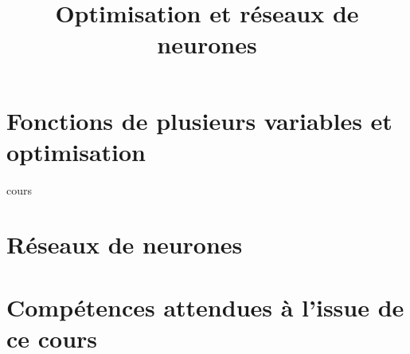 \documentclass[fleqn,a4paper,11pt]{book}
\title{Optimisation et réseaux de neurones}
\begin{document}
\maketitle
\tableofcontents
\newpage

\newcommand{\myscale}{1}
\newcommand{\couleurnb}[2]{#2}
\chapter{Fonctions de plusieurs variables et optimisation}

{cours}

\newpage

\chapter{Réseaux de neurones}

\newpage



\appendix
\chapter{Compétences attendues à l'issue de ce cours}

\end{document}
